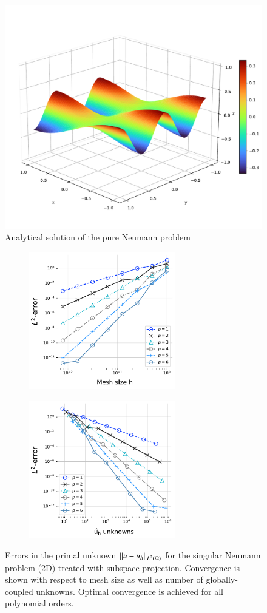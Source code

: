 \begin{figure}[htpb]
  \centering
  \includegraphics[width=0.5\linewidth]{img/dp_study_analytical.pdf}
  \caption{Analytical solution of the pure Neumann problem}
  \label{fig:dp_neumann_problem_analytical}
\end{figure}
\begin{figure}[ht]
    \centering
    \begin{subfigure}{0.45\textwidth}
        \includegraphics[height=6cm]{img/PNP_conv_2D_mesh_size.pdf}
    \end{subfigure}
    \begin{subfigure}{0.45\textwidth}
        \includegraphics[height=6cm]{img/PNP_conv_2D_dofs.pdf}
    \end{subfigure}
    \caption{Errors in the primal unknown $\left\lVert u - u_h \right\rVert_{L^2(\Omega)} $ for the singular Neumann problem (2D) treated with subspace projection. Convergence is shown with respect to mesh size as well as number of globally-coupled unknowns. Optimal convergence is achieved for all polynomial orders.}
    \label{}
\end{figure}

